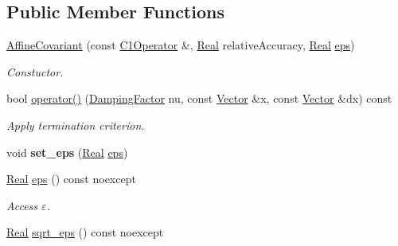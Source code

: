 \subsection*{\-Public \-Member \-Functions}
\begin{DoxyCompactItemize}
\item 
\hypertarget{classSpacy_1_1Newton_1_1Termination_1_1AffineCovariant_ab3977d3ebf7737d8f44b1b6beb949eaf}{\hyperlink{classSpacy_1_1Newton_1_1Termination_1_1AffineCovariant_ab3977d3ebf7737d8f44b1b6beb949eaf}{\-Affine\-Covariant} (const \hyperlink{classSpacy_1_1C1Operator}{\-C1\-Operator} \&, \hyperlink{classSpacy_1_1Real}{\-Real} relative\-Accuracy, \hyperlink{classSpacy_1_1Real}{\-Real} \hyperlink{classSpacy_1_1Mixin_1_1Eps_a812b99b0abc1d78a34b4114907f23f52}{eps})}\label{classSpacy_1_1Newton_1_1Termination_1_1AffineCovariant_ab3977d3ebf7737d8f44b1b6beb949eaf}

\begin{DoxyCompactList}\small\item\em \-Constuctor. \end{DoxyCompactList}\item 
bool \hyperlink{classSpacy_1_1Newton_1_1Termination_1_1AffineCovariant_aa33460372120d1ddcd3daf7c79140dcf}{operator()} (\hyperlink{classSpacy_1_1DampingFactor}{\-Damping\-Factor} nu, const \hyperlink{classSpacy_1_1Vector}{\-Vector} \&x, const \hyperlink{classSpacy_1_1Vector}{\-Vector} \&dx) const 
\begin{DoxyCompactList}\small\item\em \-Apply termination criterion. \end{DoxyCompactList}\item 
\hypertarget{classSpacy_1_1Mixin_1_1Eps_a818ab6dfab5e4eea583e1302bcc621f8}{void {\bfseries set\-\_\-eps} (\hyperlink{classSpacy_1_1Real}{\-Real} \hyperlink{classSpacy_1_1Mixin_1_1Eps_a812b99b0abc1d78a34b4114907f23f52}{eps})}\label{classSpacy_1_1Mixin_1_1Eps_a818ab6dfab5e4eea583e1302bcc621f8}

\item 
\hypertarget{classSpacy_1_1Mixin_1_1Eps_a812b99b0abc1d78a34b4114907f23f52}{\hyperlink{classSpacy_1_1Real}{\-Real} \hyperlink{classSpacy_1_1Mixin_1_1Eps_a812b99b0abc1d78a34b4114907f23f52}{eps} () const noexcept}\label{classSpacy_1_1Mixin_1_1Eps_a812b99b0abc1d78a34b4114907f23f52}

\begin{DoxyCompactList}\small\item\em \-Access $\varepsilon$. \end{DoxyCompactList}\item 
\hypertarget{classSpacy_1_1Mixin_1_1Eps_a1c1b0ed7f14ed4967dc7da9295a136d4}{\hyperlink{classSpacy_1_1Real}{\-Real} \hyperlink{classSpacy_1_1Mixin_1_1Eps_a1c1b0ed7f14ed4967dc7da9295a136d4}{sqrt\-\_\-eps} () const noexcept}\label{classSpacy_1_1Mixin_1_1Eps_a1c1b0ed7f14ed4967dc7da9295a136d4}


\end{DoxyCompactItemize}

